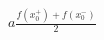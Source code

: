 \documentclass[preview]{standalone}
\begin{document}
\begin{center}
$\displaystyle{a\frac{f(x_0^+)+f(x_0^-)}{2}}$
\end{center}
\end{document}
